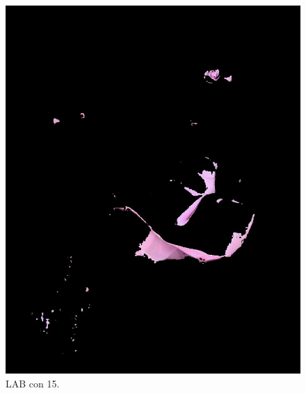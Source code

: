\documentclass[11pt, letterpaper]{article}
\begin{document}
\begin{figure}[h!]
	\begin{minipage}{0.4\textwidth}
		\centering
		\includegraphics[width=\textwidth]{IMG/R33.jpg}
		\caption*{LAB con 15.}
	\end{minipage}\hfill
	\begin{minipage}{0.4\textwidth}
		\centering

\end{minipage}
\end{figure}
\end{document}
